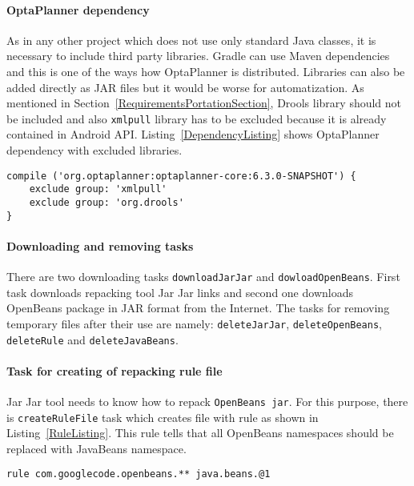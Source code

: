 \paragraph{OptaPlanner dependency}
As in any other project which does not use only standard Java classes, it is necessary to include third party libraries.
Gradle can use Maven dependencies and this is one of the ways how OptaPlanner is distributed. Libraries can also be
added directly as JAR files but it would be worse for automatization. As mentioned in
Section~\ref{RequirementsPortationSection}, Drools library should not be included and also \texttt{xmlpull} library has
to be excluded because it is already contained in Android API. Listing~\ref{DependencyListing} shows OptaPlanner
dependency with excluded libraries.
\\
\begin{lstlisting}[captionpos={b},caption={Optaplanner Maven dependency in Gradle build script.},frame={lines},
label={DependencyListing},basicstyle=\footnotesize]
compile ('org.optaplanner:optaplanner-core:6.3.0-SNAPSHOT') {
    exclude group: 'xmlpull'
    exclude group: 'org.drools'
}
\end{lstlisting}

\paragraph{Downloading and removing tasks}
There are two downloading tasks \texttt{downloadJarJar} and \texttt{dowloadOpenBeans}. First task downloads repacking
tool Jar Jar links and second one downloads OpenBeans package in JAR format from the Internet. The tasks for removing
temporary files after their use are namely: \texttt{deleteJarJar}, \texttt{deleteOpenBeans}, \texttt{deleteRule} and
\texttt{deleteJavaBeans}.

\paragraph{Task for creating of repacking rule file}
Jar Jar tool needs to know how to repack \texttt{OpenBeans jar}. For this purpose, there is \texttt{createRuleFile} task
which creates file with rule as shown in Listing~\ref{RuleListing}. This rule tells that all OpenBeans namespaces should
be replaced with JavaBeans namespace.
\\
\begin{lstlisting}[captionpos={b},caption={Jar Jar Links rule for repacking OpenBeans to Java core namespace.},
frame={lines},label={RuleListing},basicstyle=\footnotesize]
rule com.googlecode.openbeans.** java.beans.@1
\end{lstlisting}

